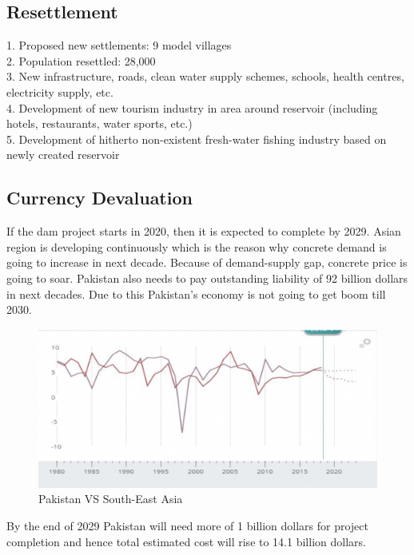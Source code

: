 \documentclass[11pt, journal,letterpaper,compsoc]{IEEEtran}
\begin{document}
\subsection{Resettlement}
 1. Proposed new settlements: 9 model villages  \\
 2.  Population resettled: 28,000 \\
 3. New infrastructure, roads, clean water supply schemes, schools, health centres, electricity supply, etc. \\ 
 4. Development of new tourism industry in area around reservoir (including hotels, restaurants, water sports, etc.) \\
 5. Development of hitherto non-existent fresh-water fishing industry based on newly created reservoir \\

\subsection{Currency Devaluation}
If the dam project starts in 2020, then it is expected to complete by 2029. Asian region is developing continuously which is the reason why concrete demand is going to increase in next decade. Because of demand-supply gap, concrete price is going to soar. Pakistan also needs to pay outstanding liability of 92 billion dollars in next decades. Due to this Pakistan’s economy is not going to get boom till 2030.

\begin{figure}  [h!]
\includegraphics[width=\linewidth]{images/pak-vs-asia}
 \caption{Pakistan VS South-East Asia}
\end{figure}

By the end of 2029 Pakistan will need more of 1 billion dollars for project completion and hence  total estimated cost will rise to 14.1 billion dollars.\\
\end{document}
